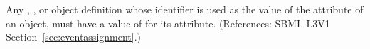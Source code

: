 Any \Compartment, \Species, \Parameter or \SpeciesReference object
definition whose identifier is used as the value of the 
attribute of an \EventAssignment object, must have a value of 
for its  attribute.  (References: SBML L3V1
Section~\ref{sec:eventassignment}.)
